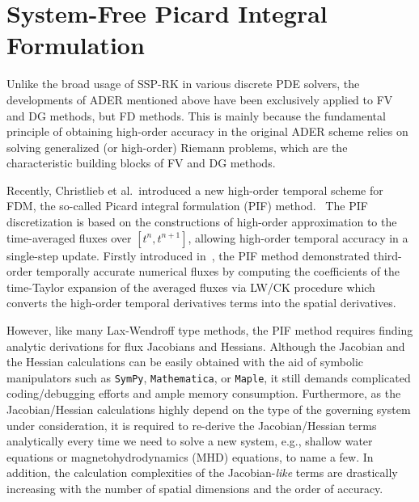 \chapter{System-Free Picard Integral Formulation}\label{chap:sfpif}

Unlike the broad usage of SSP-RK in various discrete PDE solvers,
the developments of ADER mentioned above have been exclusively applied to FV and DG methods, but FD methods.
This is mainly because the fundamental principle of obtaining high-order accuracy
in the original ADER scheme relies on solving generalized (or high-order) Riemann problems,
which are the characteristic building blocks of FV and DG methods.

Recently, Christlieb et al.\ introduced a new high-order temporal scheme for FDM,
the so-called Picard integral formulation (PIF) method.~\cite{christlieb2015picard,seal2016explicit}
The PIF discretization is based on the constructions of high-order approximation
to the time-averaged fluxes over \( \left[ t^{n}, t^{n + 1} \right] \),
allowing high-order temporal accuracy in a single-step update.
Firstly introduced in~\cite{christlieb2015picard},
the PIF method demonstrated third-order temporally accurate numerical fluxes
by computing the coefficients of the time-Taylor expansion of the averaged fluxes
via LW/CK procedure which converts the high-order temporal derivatives terms into the spatial derivatives.

However, like many Lax-Wendroff type methods, the PIF method requires
finding analytic derivations for flux Jacobians and Hessians.
Although the Jacobian and the Hessian calculations can be easily obtained
with the aid of symbolic manipulators such as \texttt{SymPy}, \texttt{Mathematica}, or \texttt{Maple},
it still demands complicated coding/debugging efforts and ample memory consumption.
Furthermore, as the Jacobian/Hessian calculations highly depend on the
type of the governing system under consideration,
it is required to re-derive the Jacobian/Hessian terms analytically every time
we need to solve a new system, e.g., shallow water equations or magnetohydrodynamics (MHD) equations, to name a few.
In addition, the calculation complexities of the Jacobian-\textit{like} terms are drastically increasing
with the number of spatial dimensions and the order of accuracy.




